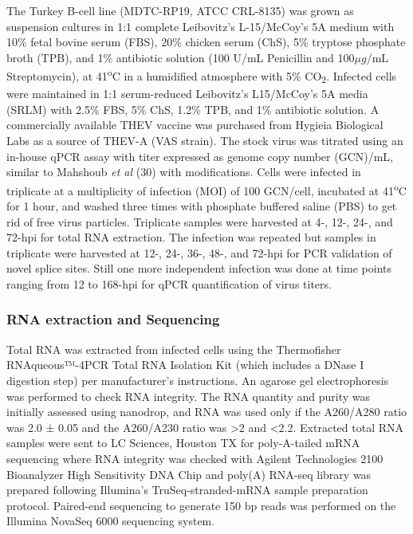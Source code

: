 \documentclass[
]{article}
\begin{document}
The Turkey B-cell line (MDTC-RP19, ATCC CRL-8135) was grown as
suspension cultures in 1:1 complete Leibovitz's L-15/McCoy's 5A medium
with 10\% fetal bovine serum (FBS), 20\% chicken serum (ChS), 5\%
tryptose phosphate broth (TPB), and 1\% antibiotic solution (100 U/mL
Penicillin and 100\(\mu g\)/mL Streptomycin), at 41\textsuperscript{o}C
in a humidified atmosphere with 5\% CO\textsubscript{2}. Infected cells
were maintained in 1:1 serum-reduced Leibovitz's L15/McCoy's 5A media
(SRLM) with 2.5\% FBS, 5\% ChS, 1.2\% TPB, and 1\% antibiotic solution.
A commercially available THEV vaccine was purchased from Hygieia
Biological Labs as a source of THEV-A (VAS strain). The stock virus was
titrated using an in-house qPCR assay with titer expressed as genome
copy number (GCN)/mL, similar to Mahshoub \emph{et al} (30) with
modifications. Cells were infected in triplicate at a multiplicity of
infection (MOI) of 100 GCN/cell, incubated at 41\textsuperscript{o}C for
1 hour, and washed three times with phosphate buffered saline (PBS) to
get rid of free virus particles. Triplicate samples were harvested at
4-, 12-, 24-, and 72-hpi for total RNA extraction. The infection was
repeated but samples in triplicate were harvested at 12-, 24-, 36-, 48-,
and 72-hpi for PCR validation of novel splice sites. Still one more
independent infection was done at time points ranging from 12 to 168-hpi
for qPCR quantification of virus titers.

\subsubsection{RNA extraction and
Sequencing}\label{rna-extraction-and-sequencing}

Total RNA was extracted from infected cells using the Thermofisher
RNAqueous™-4PCR Total RNA Isolation Kit (which includes a DNase I
digestion step) per manufacturer's instructions. An agarose gel
electrophoresis was performed to check RNA integrity. The RNA quantity
and purity was initially assessed using nanodrop, and RNA was used only
if the A260/A280 ratio was 2.0 ± 0.05 and the A260/A230 ratio was
\textgreater2 and \textless2.2. Extracted total RNA samples were sent to
LC Sciences, Houston TX for poly-A-tailed mRNA sequencing where RNA
integrity was checked with Agilent Technologies 2100 Bioanalyzer High
Sensitivity DNA Chip and poly(A) RNA-seq library was prepared following
Illumina's TruSeq-stranded-mRNA sample preparation protocol. Paired-end
sequencing to generate 150 bp reads was performed on the Illumina
NovaSeq 6000 sequencing system.
\end{document}
